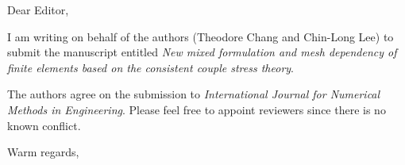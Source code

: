 \documentclass[a4paper,11pt]{letter}
\begin{document}
\onehalfspacing
\begin{letter}{}
\address{E329, Civil/Mech Building\\University of Canterbury\\Christchurch, 8041, NZ}

\opening{Dear Editor,}

I am writing on behalf of the authors (Theodore Chang and Chin-Long Lee) to submit the manuscript entitled \textit{New mixed formulation and mesh dependency of finite elements based on the consistent couple stress theory}.

The authors agree on the submission to \textit{International Journal for Numerical Methods in Engineering}. Please feel free to appoint reviewers since there is no known conflict.

\signature{Theodore Chang}

\closing{Warm regards,}
\end{letter}
\clearpage
\end{document}
